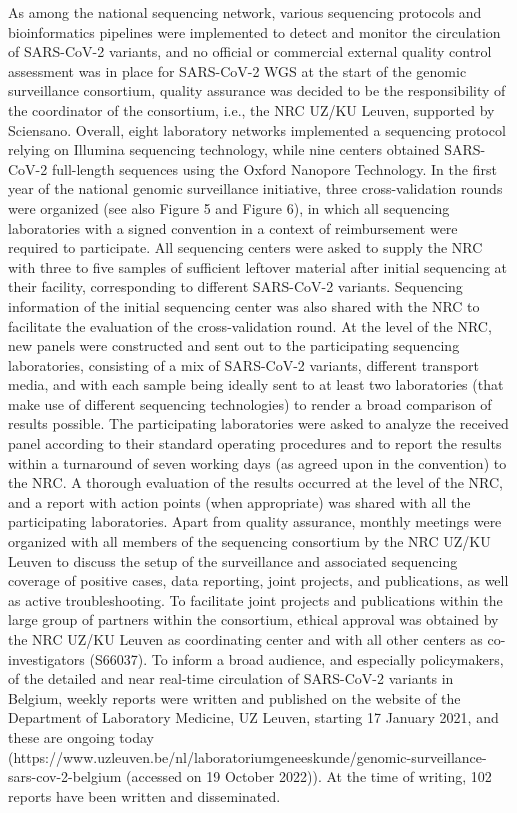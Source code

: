 As among the national sequencing network, various sequencing protocols and bioinformatics pipelines were implemented to detect and monitor the circulation of SARS-CoV-2 variants, and no official or commercial external quality control assessment was in place for SARS-CoV-2 WGS at the start of the genomic surveillance consortium, quality assurance was decided to be the responsibility of the coordinator of the consortium, i.e., the NRC UZ/KU Leuven, supported by Sciensano. Overall, eight laboratory networks implemented a sequencing protocol relying on Illumina sequencing technology, while nine centers obtained SARS-CoV-2 full-length sequences using the Oxford Nanopore Technology. In the first year of the national genomic surveillance initiative, three cross-validation rounds were organized (see also Figure 5 and Figure 6), in which all sequencing laboratories with a signed convention in a context of reimbursement were required to participate. All sequencing centers were asked to supply the NRC with three to five samples of sufficient leftover material after initial sequencing at their facility, corresponding to different SARS-CoV-2 variants. Sequencing information of the initial sequencing center was also shared with the NRC to facilitate the evaluation of the cross-validation round. At the level of the NRC, new panels were constructed and sent out to the participating sequencing laboratories, consisting of a mix of SARS-CoV-2 variants, different transport media, and with each sample being ideally sent to at least two laboratories (that make use of different sequencing technologies) to render a broad comparison of results possible. The participating laboratories were asked to analyze the received panel according to their standard operating procedures and to report the results within a turnaround of seven working days (as agreed upon in the convention) to the NRC. A thorough evaluation of the results occurred at the level of the NRC, and a report with action points (when appropriate) was shared with all the participating laboratories. Apart from quality assurance, monthly meetings were organized with all members of the sequencing consortium by the NRC UZ/KU Leuven to discuss the setup of the surveillance and associated sequencing coverage of positive cases, data reporting, joint projects, and publications, as well as active troubleshooting. To facilitate joint projects and publications within the large group of partners within the consortium, ethical approval was obtained by the NRC UZ/KU Leuven as coordinating center and with all other centers as co-investigators (S66037). To inform a broad audience, and especially policymakers, of the detailed and near real-time circulation of SARS-CoV-2 variants in Belgium, weekly reports were written and published on the website of the Department of Laboratory Medicine, UZ Leuven, starting 17 January 2021, and these are ongoing today (https://www.uzleuven.be/nl/laboratoriumgeneeskunde/genomic-surveillance-sars-cov-2-belgium (accessed on 19 October 2022)). At the time of writing, 102 reports have been written and disseminated.
